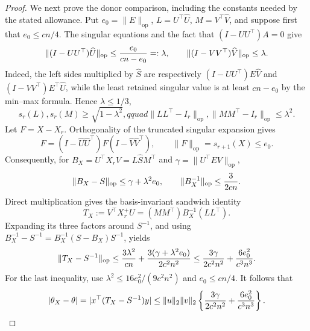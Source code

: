 \documentclass{article}
\begin{document}
\begin{proof}
We next prove the donor comparison, including the constants needed by the stated allowance.  Put \(e_0=\|E\|_{\mathrm{op}}\), \(L=U^{\top}\widehat U\), \(M=V^{\top}\widehat V\), and suppose first that \(e_0\le cn/4\).  The singular equations and the fact that \((I-UU^{\top})A=0\) give
\[
 \|(I-UU^{\top})\widehat U\|_{\mathrm{op}}
 \le {e_0\over cn-e_0}=:\lambda,
 \qquad
 \|(I-VV^{\top})\widehat V\|_{\mathrm{op}}\le\lambda.
\]
Indeed, the left sides multiplied by \(\widehat S\) are respectively \((I-UU^{\top})E\widehat V\) and \((I-VV^{\top})E^{\top}\widehat U\), while the least retained singular value is at least \(cn-e_0\) by the min--max formula.  Hence \(\lambda\le1/3\),
\[
 s_r(L),s_r(M)\ge\sqrt{1-\lambda^2},qquad
 \|LL^{\top}-I_r\|_{\mathrm{op}},\|MM^{\top}-I_r\|_{\mathrm{op}}\le\lambda^2.
\]
Let \(F=X-X_r\).  Orthogonality of the truncated singular expansion gives
\[
 F=(I-\widehat U\widehat U^{\top})F(I-\widehat V\widehat V^{\top}),
 \qquad \|F\|_{\mathrm{op}}=s_{r+1}(X)\le e_0.
\]
Consequently, for \(B_X=U^{\top}X_rV=L\widehat S M^{\top}\) and \(\gamma=\|U^{\top}EV\|_{\mathrm{op}}\),
\[
 \|B_X-S\|_{\mathrm{op}}\le\gamma+\lambda^2e_0,
 \qquad \|B_X^{-1}\|_{\mathrm{op}}\le {3\over2cn}.
\]
Direct multiplication gives the basis-invariant sandwich identity
\[
 T_X:=V^{\top}X_r^+U=(MM^{\top})B_X^{-1}(LL^{\top}).
\]
Expanding its three factors around \(S^{-1}\), and using
\(B_X^{-1}-S^{-1}=B_X^{-1}(S-B_X)S^{-1}\), yields
\[
 \|T_X-S^{-1}\|_{\mathrm{op}}
 \le {3\lambda^2\over cn}+{3(\gamma+\lambda^2e_0)\over2c^2n^2}
 \le {3\gamma\over2c^2n^2}+{6e_0^2\over c^3n^3}.
\]
For the last inequality, use \(\lambda^2\le16e_0^2/(9c^2n^2)\) and \(e_0\le cn/4\).  It follows that
\[
 |\theta_X-\theta|
 =|x^{\top}(T_X-S^{-1})y|
 \le\|u\|_2\|v\|_2
 \left\{{3\gamma\over2c^2n^2}+{6e_0^2\over c^3n^3}\right\}.
\]


\end{proof}
\end{document}
